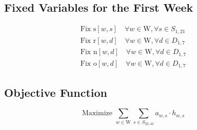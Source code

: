 \documentclass{article}
\begin{document}
\subsection*{Fixed Variables for the First Week}
\begin{align*}
\text{Fix } \text{s}[w, s]  \quad \forall w \in \text{W}, \forall s \in S_{1, 21} \\
\text{Fix } \text{r}[w, d]  \quad \forall w \in \text{W}, \forall d \in D_{1, 7} \\
\text{Fix } \text{n}[w, d]  \quad \forall w \in \text{W}, \forall d \in D_{1, 7} \\
\text{Fix } \text{o}[w, d]  \quad \forall w \in \text{W}, \forall d \in D_{1, 7}
\end{align*}

\subsection*{Objective Function}
\[
\text{Maximize } \sum_{w \in \text{W}} \sum_{s \in S_{22, 42}} a_{w, s} \cdot h_{w, s}
\]
\end{document}
